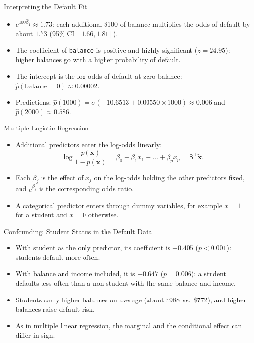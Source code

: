 \begin{frame}{Interpreting the Default Fit}
    \begin{itemize}
        \item $e^{100 \hat{\beta}_1} \approx 1.73$: each additional \$100 of balance multiplies the odds of default by about $1.73$ (95\% CI $[1.66, 1.81]$).
        \item The coefficient of \texttt{balance} is positive and highly significant ($z = 24.95$): higher balances go with a higher probability of default.
        \item The intercept is the log-odds of default at zero balance: $\hat{p}(\text{balance} = 0) \approx 0.00002$.
        \item Predictions: $\hat{p}(1000) = \sigma(-10.6513 + 0.00550 \times 1000) \approx 0.006$ and $\hat{p}(2000) \approx 0.586$.
    \end{itemize}
\end{frame}


\begin{frame}{Multiple Logistic Regression}
    \begin{itemize}
        \item Additional predictors enter the log-odds linearly:
        \[
            \log \frac{p(\mathbf{x})}{1 - p(\mathbf{x})} = \beta_0 + \beta_1 x_1 + \dots + \beta_p x_p = \symbf{\beta}^\top \tilde{\mathbf{x}}.
        \]
        \item Each $\beta_j$ is the effect of $x_j$ on the log-odds holding the other predictors fixed, and $e^{\beta_j}$ is the corresponding odds ratio.
        \item A categorical predictor enters through dummy variables, for example $x = 1$ for a student and $x = 0$ otherwise.
    \end{itemize}
\end{frame}


\begin{frame}{Confounding: Student Status in the Default Data}
    \begin{itemize}
        \item With student as the only predictor, its coefficient is $+0.405$ ($p < 0.001$): students default more often.
        \item With balance and income included, it is $-0.647$ ($p = 0.006$): a student defaults less often than a non-student with the same balance and income.
        \item Students carry higher balances on average (about \$988 vs.\ \$772), and higher balances raise default risk.
        \item As in multiple linear regression, the marginal and the conditional effect can differ in sign.
    \end{itemize}
\end{frame}


